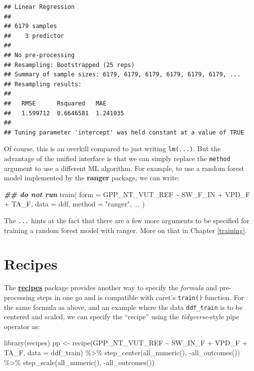 \documentclass[
]{book}
\newenvironment{Shaded}{\begin{snugshade}}{\end{snugshade}}
\newcommand{\AttributeTok}[1]{\textcolor[rgb]{0.77,0.63,0.00}{#1}}
\newcommand{\DocumentationTok}[1]{\textcolor[rgb]{0.56,0.35,0.01}{\textbf{\textit{#1}}}}
\newcommand{\FunctionTok}[1]{\textcolor[rgb]{0.00,0.00,0.00}{#1}}
\newcommand{\NormalTok}[1]{#1}
\newcommand{\OtherTok}[1]{\textcolor[rgb]{0.56,0.35,0.01}{#1}}
\newcommand{\SpecialCharTok}[1]{\textcolor[rgb]{0.00,0.00,0.00}{#1}}
\newcommand{\StringTok}[1]{\textcolor[rgb]{0.31,0.60,0.02}{#1}}
\begin{document}
\begin{verbatim}
## Linear Regression 
## 
## 6179 samples
##    3 predictor
## 
## No pre-processing
## Resampling: Bootstrapped (25 reps) 
## Summary of sample sizes: 6179, 6179, 6179, 6179, 6179, 6179, ... 
## Resampling results:
## 
##   RMSE      Rsquared   MAE     
##   1.599712  0.6646581  1.241035
## 
## Tuning parameter 'intercept' was held constant at a value of TRUE
\end{verbatim}

Of course, this is an overkill compared to just writing \texttt{lm(...)}. But the advantage of the unified interface is that we can simply replace the \texttt{method} argument to use a different ML algorithm. For example, to use a random forest model implemented by the \textbf{ranger} package, we can write:

\begin{Shaded}
\begin{Highlighting}[]
\DocumentationTok{\#\# do not run}
\FunctionTok{train}\NormalTok{(}
  \AttributeTok{form =}\NormalTok{ GPP\_NT\_VUT\_REF }\SpecialCharTok{\textasciitilde{}}\NormalTok{ SW\_F\_IN }\SpecialCharTok{+}\NormalTok{ VPD\_F }\SpecialCharTok{+}\NormalTok{ TA\_F, }
  \AttributeTok{data =}\NormalTok{ ddf, }
  \AttributeTok{method =} \StringTok{"ranger"}\NormalTok{,}
\NormalTok{  ...}
\NormalTok{)}
\end{Highlighting}
\end{Shaded}

The \texttt{...} hints at the fact that there are a few more arguments to be specified for training a random forest model with ranger. More on that in Chapter \ref{training}.

\hypertarget{recipes}{%
\section{Recipes}\label{recipes}}

The \href{https://recipes.tidymodels.org/}{\textbf{recipes}} package provides another way to specify the \emph{formula} and pre-processing steps in one go and is compatible with caret's \texttt{train()} function. For the same formula as above, and an example where the data \texttt{ddf\_train} is to be centered and scaled, we can specify the ``recipe'' using the \emph{tidyverse}-style pipe operator as:

\begin{Shaded}
\begin{Highlighting}[]
\FunctionTok{library}\NormalTok{(recipes)}
\NormalTok{pp }\OtherTok{\textless{}{-}} \FunctionTok{recipe}\NormalTok{(GPP\_NT\_VUT\_REF }\SpecialCharTok{\textasciitilde{}}\NormalTok{ SW\_IN\_F }\SpecialCharTok{+}\NormalTok{ VPD\_F }\SpecialCharTok{+}\NormalTok{ TA\_F, }\AttributeTok{data =}\NormalTok{ ddf\_train) }\SpecialCharTok{\%\textgreater{}\%} 
  \FunctionTok{step\_center}\NormalTok{(}\FunctionTok{all\_numeric}\NormalTok{(), }\SpecialCharTok{{-}}\FunctionTok{all\_outcomes}\NormalTok{()) }\SpecialCharTok{\%\textgreater{}\%}
  \FunctionTok{step\_scale}\NormalTok{(}\FunctionTok{all\_numeric}\NormalTok{(), }\SpecialCharTok{{-}}\FunctionTok{all\_outcomes}\NormalTok{())}
\end{Highlighting}
\end{Shaded}
\end{document}
